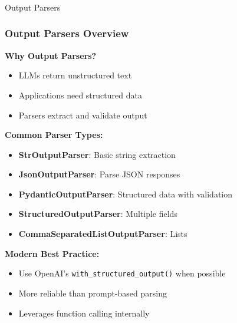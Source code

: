 \begin{frame}[fragile]\frametitle{}
\begin{center}
{\Large Output Parsers}
\end{center}
\end{frame}

\begin{frame}[fragile]\frametitle{Output Parsers Overview}

\textbf{Why Output Parsers?}
\begin{itemize}
\item LLMs return unstructured text
\item Applications need structured data
\item Parsers extract and validate output
\end{itemize}

\textbf{Common Parser Types:}
\begin{itemize}
\item \textbf{StrOutputParser}: Basic string extraction
\item \textbf{JsonOutputParser}: Parse JSON responses
\item \textbf{PydanticOutputParser}: Structured data with validation
\item \textbf{StructuredOutputParser}: Multiple fields
\item \textbf{CommaSeparatedListOutputParser}: Lists
\end{itemize}

\textbf{Modern Best Practice:}
\begin{itemize}
\item Use OpenAI's \texttt{with\_structured\_output()} when possible
\item More reliable than prompt-based parsing
\item Leverages function calling internally
\end{itemize}

\end{frame}

